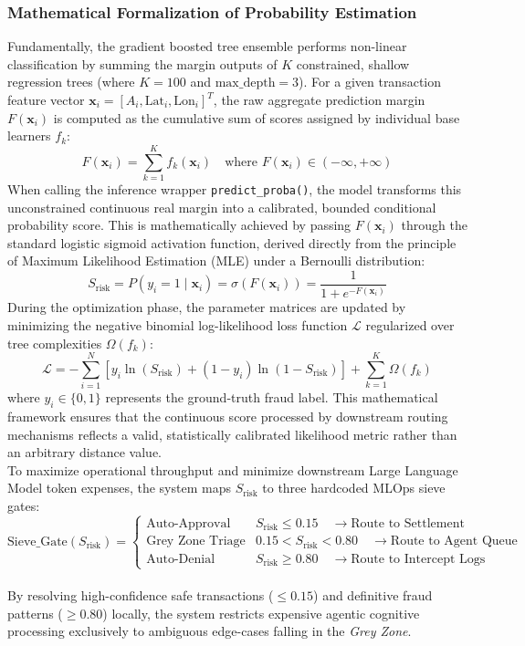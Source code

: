 \documentclass[12pt]{report}
\begin{document}
\subsubsection{Mathematical Formalization of Probability Estimation}
Fundamentally, the gradient boosted tree ensemble performs non-linear classification by summing the margin outputs of $K$ constrained, shallow regression trees (where $K = 100$ and $\text{max\_depth} = 3$). For a given transaction feature vector $\mathbf{x}_i = [A_i, \text{Lat}_i, \text{Lon}_i]^T$, the raw aggregate prediction margin $F(\mathbf{x}_i)$ is computed as the cumulative sum of scores assigned by individual base learners $f_k$:
$$
    F(\mathbf{x}_i) = \sum_{k=1}^{K} f_k(\mathbf{x}_i) \quad \text{where } F(\mathbf{x}_i) \in (-\infty, +\infty)
$$
When calling the inference wrapper \texttt{predict\_proba()}, the model transforms this unconstrained continuous real margin into a calibrated, bounded conditional probability score. This is mathematically achieved by passing $F(\mathbf{x}_i)$ through the standard logistic sigmoid activation function, derived directly from the principle of Maximum Likelihood Estimation (MLE) under a Bernoulli distribution:
$$
    S_{\text{risk}} = P(y_i = 1 \mid \mathbf{x}_i) = \sigma(F(\mathbf{x}_i)) = \frac{1}{1 + e^{-F(\mathbf{x}_i)}}
    \label{eq:sigmoid_inference}
$$
During the optimization phase, the parameter matrices are updated by minimizing the negative binomial log-likelihood loss function $\mathcal{L}$ regularized over tree complexities $\Omega(f_k)$:
$$
    \mathcal{L} = -\sum_{i=1}^{N} \left[ y_i \ln(S_{\text{risk}}) + (1 - y_i) \ln(1 - S_{\text{risk}}) \right] + \sum_{k=1}^{K} \Omega(f_k)
$$
where $y_i \in \{0, 1\}$ represents the ground-truth fraud label. This mathematical framework ensures that the continuous score processed by downstream routing mechanisms reflects a valid, statistically calibrated likelihood metric rather than an arbitrary distance value.
\\
To maximize operational throughput and minimize downstream Large Language Model token expenses, the system maps $S_{\text{risk}}$ to three hardcoded MLOps sieve gates:
$$
    \text{Sieve\_Gate}(S_{\text{risk}}) = 
    \begin{cases} 
        \text{Auto-Approval} & S_{\text{risk}} \le 0.15 \quad \rightarrow \text{Route to Settlement} \\
        \text{Grey Zone Triage} & 0.15 < S_{\text{risk}} < 0.80 \quad \rightarrow \text{Route to Agent Queue} \\
        \text{Auto-Denial} & S_{\text{risk}} \ge 0.80 \quad \rightarrow \text{Route to Intercept Logs} 
    \end{cases}
$$
\\
By resolving high-confidence safe transactions ($\le 0.15$) and definitive fraud patterns ($\ge 0.80$) locally, the system restricts expensive agentic cognitive processing exclusively to ambiguous edge-cases falling in the \textit{Grey Zone}.
\end{document}
